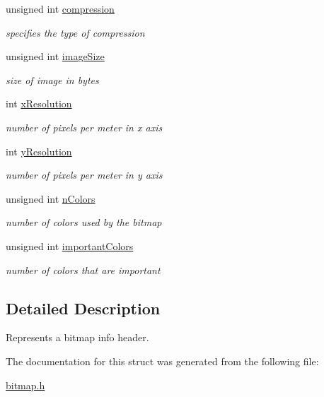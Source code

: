 \begin{DoxyCompactItemize}
unsigned int \mbox{\hyperlink{group__bitmap_ga87fb38b0fe68db4bed899b9733d1b7e9}{compression}}
\begin{DoxyCompactList}\small\item\em specifies the type of compression \end{DoxyCompactList}\item 
unsigned int \mbox{\hyperlink{group__bitmap_ga79bc984a7fd1c0f00ede6aa09143939f}{image\+Size}}
\begin{DoxyCompactList}\small\item\em size of image in bytes \end{DoxyCompactList}\item 
int \mbox{\hyperlink{group__bitmap_ga391cf1da75d16aee3b6539ccf5b29300}{x\+Resolution}}
\begin{DoxyCompactList}\small\item\em number of pixels per meter in x axis \end{DoxyCompactList}\item 
int \mbox{\hyperlink{group__bitmap_gaf2fadf9c216cc9f3ce401096e35be1b7}{y\+Resolution}}
\begin{DoxyCompactList}\small\item\em number of pixels per meter in y axis \end{DoxyCompactList}\item 
unsigned int \mbox{\hyperlink{group__bitmap_ga4c543a08d1b72bdda2329b426a213e2a}{n\+Colors}}
\begin{DoxyCompactList}\small\item\em number of colors used by the bitmap \end{DoxyCompactList}\item 
unsigned int \mbox{\hyperlink{group__bitmap_ga9d87941fcc414085f7361fd89818ee3f}{important\+Colors}}
\begin{DoxyCompactList}\small\item\em number of colors that are important \end{DoxyCompactList}\end{DoxyCompactItemize}


\subsection{Detailed Description}
Represents a bitmap info header. 

The documentation for this struct was generated from the following file\+:\begin{DoxyCompactItemize}
\item 
\mbox{\hyperlink{bitmap_8h}{bitmap.\+h}}\end{DoxyCompactItemize}
